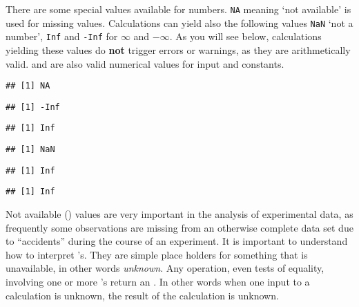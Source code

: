 \documentclass[paper=a4,headsepline,BCOR=12mm,twoside,open=right,%
titlepage,headings=small,fontsize=10pt,index=totoc,bibliography=totoc,%
captions=tableheading,captions=nooneline]{scrbook}\usepackage{knitr}
\begin{document}
There are some special values available for numbers. \texttt{NA} meaning `not available' is used for missing values. Calculations can yield also the following values \texttt{NaN} `not a number', \texttt{Inf} and \texttt{-Inf} for $\infty$ and $-\infty$. As you will see below, calculations yielding these values do \textbf{not} trigger errors or warnings, as they are arithmetically valid.  and  are also valid numerical values for input and constants.

\begin{knitrout}\footnotesize
{}\color{fgcolor}\begin{kframe}
\begin{alltt}
 \hlkwb{<-} 
\end{alltt}
\begin{verbatim}
## [1] NA
\end{verbatim}
\begin{alltt}
\hlopt{-} \hlopt{/} 
\end{alltt}
\begin{verbatim}
## [1] -Inf
\end{verbatim}
\begin{alltt}
 \hlopt{/} 
\end{alltt}
\begin{verbatim}
## [1] Inf
\end{verbatim}
\begin{alltt}
 \hlopt{/} 
\end{alltt}
\begin{verbatim}
## [1] NaN
\end{verbatim}
\begin{alltt}
 \hlopt{+} 
\end{alltt}
\begin{verbatim}
## [1] Inf
\end{verbatim}
\begin{alltt}
 \hlkwb{<-} \hlopt{-}
 \hlopt{* -}
\end{alltt}
\begin{verbatim}
## [1] Inf
\end{verbatim}
\end{kframe}
\end{knitrout}

Not available () values are very important in the analysis of experimental data, as frequently some observations are missing from an otherwise complete data set due to ``accidents'' during the course of an experiment. It is important to understand how to interpret 's. They are simple place holders for something that is unavailable, in other words \emph{unknown}. Any operation, even tests of equality, involving one or more 's return an . In other words when one input to a calculation is unknown, the result of the calculation is unknown.
\end{document}
